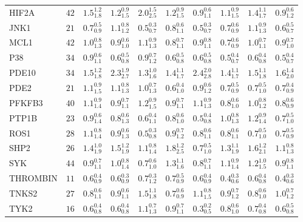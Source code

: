 \begin{tabular}{llllllllll}
HIF2A       &   $42$ &  $1.5^{1.2}_{1.8}$ &  $1.2^{0.9}_{1.5}$ &  $2.0^{1.5}_{2.5}$ &  $1.2^{0.9}_{1.5}$ &  $0.9^{0.6}_{1.1}$ &  $1.1^{0.9}_{1.5}$ &     $1.4^{1.1}_{1.7}$ &  $0.9^{0.6}_{1.2}$ \\
JNK1        &   $21$ &  $0.7^{0.5}_{0.9}$ &  $1.1^{0.8}_{1.2}$ &  $0.5^{0.3}_{0.7}$ &  $0.8^{0.6}_{1.1}$ &  $0.5^{0.3}_{0.7}$ &  $0.7^{0.6}_{0.9}$ &     $1.1^{0.9}_{1.3}$ &  $0.6^{0.5}_{0.7}$ \\
MCL1        &   $42$ &  $1.0^{0.8}_{1.3}$ &  $0.9^{0.6}_{1.0}$ &  $1.1^{0.9}_{1.3}$ &  $0.8^{0.7}_{1.1}$ &  $0.9^{0.8}_{1.1}$ &  $0.7^{0.6}_{0.9}$ &     $1.0^{0.7}_{1.1}$ &  $0.9^{0.7}_{1.0}$ \\
P38         &   $34$ &  $0.9^{0.6}_{1.1}$ &  $0.6^{0.5}_{0.8}$ &  $0.9^{0.7}_{1.2}$ &  $0.6^{0.5}_{0.8}$ &  $0.6^{0.5}_{0.8}$ &  $0.5^{0.4}_{0.7}$ &     $0.6^{0.4}_{0.8}$ &  $0.5^{0.4}_{0.7}$ \\
PDE10       &   $34$ &  $1.5^{1.2}_{1.8}$ &  $2.3^{1.9}_{2.7}$ &  $1.3^{1.0}_{1.6}$ &  $1.4^{1.1}_{1.7}$ &  $2.4^{2.0}_{2.8}$ &  $1.4^{1.1}_{1.7}$ &     $1.5^{1.1}_{1.8}$ &  $1.6^{1.4}_{2.0}$ \\
PDE2        &   $21$ &  $1.1^{0.9}_{1.5}$ &  $1.1^{0.8}_{1.3}$ &  $1.0^{0.7}_{1.3}$ &  $0.6^{0.4}_{1.0}$ &  $0.9^{0.6}_{1.2}$ &  $0.7^{0.5}_{0.9}$ &     $0.7^{0.5}_{1.0}$ &  $0.7^{0.4}_{0.9}$ \\
PFKFB3      &   $40$ &  $1.1^{0.9}_{1.4}$ &  $0.9^{0.7}_{1.1}$ &  $1.2^{0.9}_{1.5}$ &  $0.9^{0.7}_{1.1}$ &  $1.1^{0.9}_{1.3}$ &  $0.8^{0.6}_{1.0}$ &     $1.0^{0.8}_{1.2}$ &  $0.8^{0.6}_{0.9}$ \\
PTP1B       &   $23$ &  $0.9^{0.6}_{1.4}$ &  $0.8^{0.6}_{1.3}$ &  $0.6^{0.4}_{1.1}$ &  $0.8^{0.6}_{1.0}$ &  $0.5^{0.4}_{0.8}$ &  $1.0^{0.8}_{1.3}$ &     $1.2^{0.9}_{1.4}$ &  $0.7^{0.5}_{1.0}$ \\
ROS1        &   $28$ &  $1.1^{0.8}_{1.4}$ &  $0.9^{0.6}_{1.3}$ &  $0.5^{0.3}_{0.8}$ &  $0.9^{0.7}_{1.2}$ &  $0.8^{0.6}_{1.1}$ &  $0.8^{0.6}_{1.1}$ &     $0.7^{0.5}_{1.0}$ &  $0.7^{0.5}_{0.9}$ \\
SHP2        &   $26$ &  $1.4^{1.0}_{1.9}$ &  $1.5^{1.2}_{1.9}$ &  $1.1^{0.8}_{1.4}$ &  $1.8^{1.2}_{2.5}$ &  $0.7^{0.5}_{1.0}$ &  $1.3^{1.1}_{1.9}$ &     $1.6^{1.2}_{2.1}$ &  $1.1^{0.8}_{1.3}$ \\
SYK         &   $44$ &  $0.9^{0.7}_{1.1}$ &  $1.0^{0.8}_{1.4}$ &  $0.7^{0.6}_{1.0}$ &  $1.3^{1.1}_{1.6}$ &  $0.8^{0.7}_{1.1}$ &  $1.1^{0.9}_{1.4}$ &     $1.2^{1.0}_{1.5}$ &  $0.9^{0.8}_{1.1}$ \\
THROMBIN    &   $11$ &  $0.6^{0.4}_{0.9}$ &  $0.6^{0.3}_{0.9}$ &  $0.7^{0.3}_{1.2}$ &  $0.7^{0.5}_{0.9}$ &  $0.6^{0.4}_{0.9}$ &  $0.4^{0.3}_{0.6}$ &     $0.6^{0.4}_{0.8}$ &  $0.4^{0.3}_{0.6}$ \\
TNKS2       &   $27$ &  $0.8^{0.6}_{1.1}$ &  $0.9^{0.6}_{1.1}$ &  $1.5^{1.1}_{1.8}$ &  $0.7^{0.6}_{0.9}$ &  $1.1^{0.8}_{1.5}$ &  $0.9^{0.7}_{1.2}$ &     $0.8^{0.6}_{1.0}$ &  $1.0^{0.7}_{1.2}$ \\
TYK2        &   $16$ &  $0.6^{0.4}_{0.8}$ &  $0.6^{0.4}_{0.8}$ &  $1.1^{0.7}_{1.3}$ &  $0.9^{0.7}_{1.1}$ &  $0.3^{0.2}_{0.5}$ &  $0.8^{0.6}_{1.0}$ &     $0.7^{0.4}_{0.8}$ &  $0.6^{0.5}_{0.8}$ \\
\bottomrule
\end{tabular}
